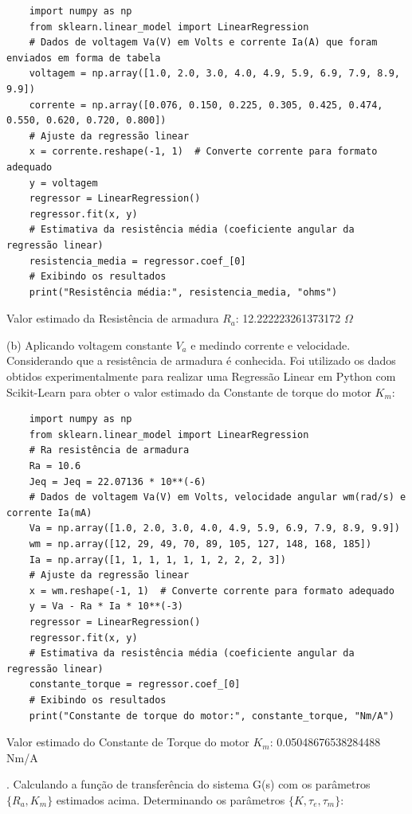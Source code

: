 \documentclass[10pt]{article}
\begin{document}
\begin{verbatim}
    import numpy as np
    from sklearn.linear_model import LinearRegression
    # Dados de voltagem Va(V) em Volts e corrente Ia(A) que foram enviados em forma de tabela
    voltagem = np.array([1.0, 2.0, 3.0, 4.0, 4.9, 5.9, 6.9, 7.9, 8.9, 9.9])
    corrente = np.array([0.076, 0.150, 0.225, 0.305, 0.425, 0.474, 0.550, 0.620, 0.720, 0.800])
    # Ajuste da regressão linear
    x = corrente.reshape(-1, 1)  # Converte corrente para formato adequado
    y = voltagem
    regressor = LinearRegression()
    regressor.fit(x, y)
    # Estimativa da resistência média (coeficiente angular da regressão linear)
    resistencia_media = regressor.coef_[0]
    # Exibindo os resultados
    print("Resistência média:", resistencia_media, "ohms")
\end{verbatim}

Valor estimado da Resistência de armadura $R_a$: 12.222223261373172 $\Omega$

\quad (b) Aplicando voltagem constante $V_a$ e medindo corrente e velocidade.
Considerando que a resistência de armadura é conhecida. Foi utilizado os dados obtidos
experimentalmente para realizar uma Regressão Linear em Python com Scikit-Learn
para obter o valor estimado da Constante de torque do motor $K_m$:

\begin{verbatim}
    import numpy as np
    from sklearn.linear_model import LinearRegression
    # Ra resistência de armadura
    Ra = 10.6
    Jeq = Jeq = 22.07136 * 10**(-6)
    # Dados de voltagem Va(V) em Volts, velocidade angular wm(rad/s) e corrente Ia(mA)
    Va = np.array([1.0, 2.0, 3.0, 4.0, 4.9, 5.9, 6.9, 7.9, 8.9, 9.9])
    wm = np.array([12, 29, 49, 70, 89, 105, 127, 148, 168, 185])
    Ia = np.array([1, 1, 1, 1, 1, 1, 2, 2, 2, 3])
    # Ajuste da regressão linear
    x = wm.reshape(-1, 1)  # Converte corrente para formato adequado
    y = Va - Ra * Ia * 10**(-3)
    regressor = LinearRegression()
    regressor.fit(x, y)
    # Estimativa da resistência média (coeficiente angular da regressão linear)
    constante_torque = regressor.coef_[0]
    # Exibindo os resultados
    print("Constante de torque do motor:", constante_torque, "Nm/A")
\end{verbatim}

\quad Valor estimado do Constante de Torque do motor $K_m$: 0.05048676538284488 Nm/A

. Calculando a função de transferência do sistema G(s) com os parâmetros $\{ R_a, K_m \}$
estimados acima. Determinando os parâmetros $\{K,\tau_e, \tau_m\}$:
\end{document}
